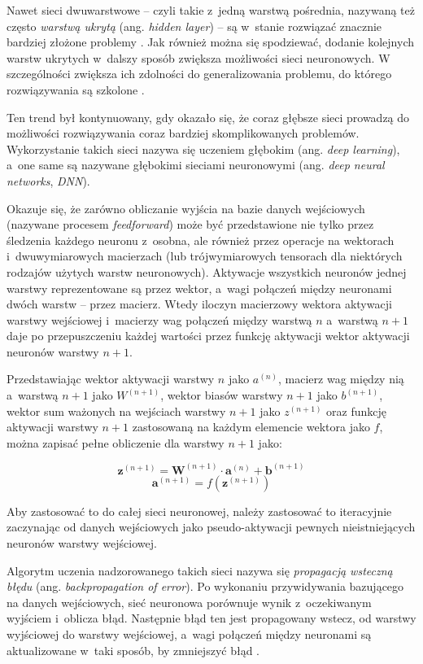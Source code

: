 {Nawet sieci dwuwarstwowe -- czyli takie z~jedną warstwą pośrednia, nazywaną też często \emph{warstwą ukrytą} (ang. \emph{hidden layer}) -- są w~stanie rozwiązać znacznie bardziej złożone problemy \cite{huang2000classification}.
Jak również można się spodziewać, dodanie kolejnych warstw ukrytych w~dalszy sposób zwiększa możliwości sieci neuronowych.
W szczególności zwiększa ich zdolności do generalizowania problemu, do którego rozwiązywania są szkolone \cite{thomas2017two}.

Ten trend był kontynuowany, gdy okazało się, że coraz głębsze sieci prowadzą do możliwości rozwiązywania coraz bardziej skomplikowanych problemów.
Wykorzystanie takich sieci nazywa się uczeniem głębokim (ang. \emph{deep learning}), a~one same są nazywane głębokimi sieciami neuronowymi (ang. \emph{deep neural networks}, \emph{DNN}).

Okazuje się, że zarówno obliczanie wyjścia na bazie danych wejściowych (nazywane procesem \emph{feedforward}) może być przedstawione nie tylko przez śledzenia każdego neuronu z~osobna, ale również przez operacje na wektorach i~dwuwymiarowych macierzach (lub trójwymiarowych tensorach dla niektórych rodzajów użytych warstw neuronowych).
Aktywacje wszystkich neuronów jednej warstwy reprezentowane są przez wektor, a~wagi połączeń między neuronami dwóch warstw -- przez macierz.
Wtedy iloczyn macierzowy wektora aktywacji warstwy wejściowej i~macierzy wag połączeń między warstwą $n$ a~warstwą $n+1$ daje po przepuszczeniu każdej wartości przez funkcję aktywacji wektor aktywacji neuronów warstwy $n+1$.

Przedstawiając wektor aktywacji warstwy $n$ jako $a^{(n)}$, macierz wag między nią a~warstwą $n+1$ jako $W^{(n+1)}$, wektor biasów warstwy $n+1$ jako $b^{(n+1)}$, wektor sum ważonych na wejściach warstwy $n+1$ jako $z^{(n+1)}$ oraz funkcję aktywacji warstwy $n+1$ zastosowaną na każdym elemencie wektora jako $f$, można zapisać pełne obliczenie dla warstwy $n+1$ jako:

\[
  \mathbf{z}^{(n+1)} = \mathbf{W}^{(n+1)} \cdot \mathbf{a}^{(n)} + \mathbf{b}^{(n+1)}
\]
\[
  \mathbf{a}^{(n+1)} = f(\mathbf{z}^{(n+1)})
\]

Aby zastosować to do całej sieci neuronowej, należy zastosować to iteracyjnie zaczynając od danych wejściowych jako pseudo-aktywacji pewnych nieistniejących neuronów warstwy wejściowej.

Algorytm uczenia nadzorowanego takich sieci nazywa się \emph{propagacją wsteczną błędu} (ang. \emph{backpropagation of error}).
Po wykonaniu przywidywania bazującego na danych wejściowych, sieć neuronowa porównuje wynik z~oczekiwanym wyjściem i~oblicza błąd.
Następnie błąd ten jest propagowany wstecz, od warstwy wyjściowej do warstwy wejściowej, a~wagi połączeń między neuronami są aktualizowane w~taki sposób, by zmniejszyć błąd \cite{rojas1996backpropagation}.

}

